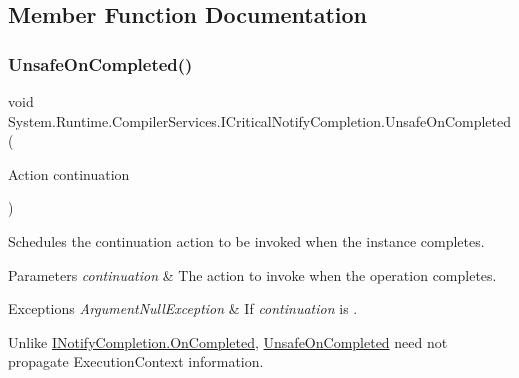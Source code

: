 \subsection{Member Function Documentation}
\mbox{\label{interface_system_1_1_runtime_1_1_compiler_services_1_1_i_critical_notify_completion_ad3e2080f494cf5b51ee57d9c4d704fc6}} 
\subsubsection{\texorpdfstring{Unsafe\+On\+Completed()}{UnsafeOnCompleted()}}
{\footnotesize\ttfamily void System.\+Runtime.\+Compiler\+Services.\+I\+Critical\+Notify\+Completion.\+Unsafe\+On\+Completed (\begin{DoxyParamCaption}\item[{Action}]{continuation }\end{DoxyParamCaption})}



Schedules the continuation action to be invoked when the instance completes.


\begin{DoxyParams}{Parameters}
{\em continuation} & The action to invoke when the operation completes.\\
\hline
\end{DoxyParams}

\begin{DoxyExceptions}{Exceptions}
{\em Argument\+Null\+Exception} & If {\itshape continuation}  is . \\
\hline
\end{DoxyExceptions}
Unlike \hyperlink{interface_system_1_1_runtime_1_1_compiler_services_1_1_i_notify_completion_ac999a22b9bc2d384bbef4d58db192efe}{I\+Notify\+Completion.\+On\+Completed}, \hyperlink{interface_system_1_1_runtime_1_1_compiler_services_1_1_i_critical_notify_completion_ad3e2080f494cf5b51ee57d9c4d704fc6}{Unsafe\+On\+Completed} need not propagate Execution\+Context information. 

